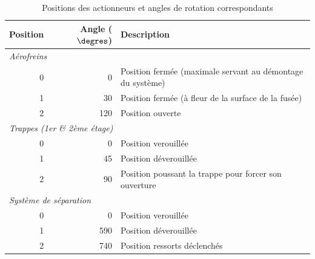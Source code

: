 \begin{table}[H]
	\centering
	\begin{tabular}{ r r l }
		\hline
		\textbf{Position} & \textbf{Angle ($\degres$)} & \textbf{Description} \\
		\hline
		\multicolumn{3}{l}{\textit{Aérofreins}} \\
		\hline
		0 & 0	& Position fermée (maximale servant au démontage du système) \\
		1 & 30	& Position fermée (à fleur de la surface de la fusée) \\
		2 & 120 & Position ouverte \\
		\hline
		\multicolumn{3}{l}{\textit{Trappes (1er \& 2ème étage)}} \\
		\hline
		0 & 0	& Position verouillée \\
		1 & 45	& Position déverouillée \\
		2 & 90	& Position poussant la trappe pour forcer son ouverture \\
		\hline
		\multicolumn{3}{l}{\textit{Système de séparation}} \\
		\hline
		0 & 0	& Position verouillée \\
		1 & 590	& Position déverouillée \\
		2 & 740	& Position ressorts déclenchés \\
		\hline
	\end{tabular}
	\caption{Positions des actionneurs et angles de rotation correspondants}
	\label{tab:positions_actionneurs}
\end{table}

\newpage


